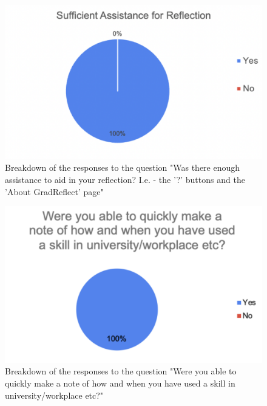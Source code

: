 \documentclass{l4proj}
\begin{document}
\begin{appendices}
\begin{figure}[H]
    \begin{centering}
    \includegraphics[scale=0.5]{images/userSurvey6.pdf}
    \caption{Breakdown of the responses to the question "Was there enough assistance to aid in your reflection? I.e. - the '?' buttons and the 'About GradReflect' page"}
    \label{fig: userSurvey6}
    \end{centering}
\end{figure}

\begin{figure}[H]
    \begin{centering}
    \includegraphics[scale=0.5]{images/userSurvey1.pdf}
    \caption{Breakdown of the responses to the question "Were you able to quickly make a note of how and when you have used a skill in university/workplace etc?"}
    \label{fig: userSurvey1}
    \end{centering}
\end{figure}


\end{appendices}
\end{document}
